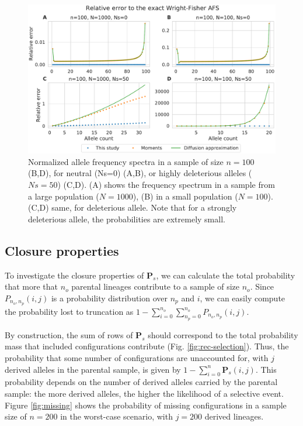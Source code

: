 \documentclass[review]{elsarticle}
\newcommand{\sgcomment}[1]{{\color{red}{SG: #1}}}
\begin{document}
\begin{figure}
  \centering
  \includegraphics[width=0.7\textheight]{fig/strong_selection_four_panel.pdf}
  \caption{Normalized allele frequency spectra in a sample of size $n=100$ (B,D), for neutral (Ns=0)
    (A,B), or highly deleterious alleles ($Ns=50$) (C,D). (A) shows the frequency spectrum in a
    sample from a large population ($N=1000$), (B) in a small population ($N=100$). (C,D) same, for
    deleterious allele. Note that for a strongly deleterious allele, the probabilities are extremely
    small.
    \label{fig:strong-selection}
   }
 
\end{figure}

\subsection{Closure properties}
\label{subsec:closure}

\sgcomment{I added the closure derivation higher up. So here we can focus on the results. }

To investigate the closure properties of $\mathbf{P}_s$, we can calculate the total probability that
more that $n_o$ parental lineages contribute to a sample of size $n_o$. \sgcomment{I'm not sure
 I understand what you describe below. My take:}
Since $P_{n_o,n_p}(i,j)$ is a probability distribution over $n_p$ and $i$, we can easily compute the probability lost to 
truncation as $1-\sum_{i=0}^{n_o} \sum_{n_p=0}^{n_o}{P_{n_o,n_p}(i,j)}$. 


By construction, the sum
of rows of $\mathbf{P}_s$ should correspond to the total probability mass that included
configurations contribute (Fig. \ref{fig:rec-selection}). Thus, the probability that some number of
configurations are unaccounted for, with $j$ derived alleles in the parental sample, is given by
$1-\sum_{i=0}^{n}\mathbf{P}_s(i,j)$. This probability depends on the number of derived alleles
carried by the parental sample: the more derived alleles, the higher the likelihood of a selective
event. Figure \ref{fig:missing} shows the probability of missing configurations in a sample size of
$n=200$ in the worst-case scenario, with $j=200$ derived lineages.
\end{document}
